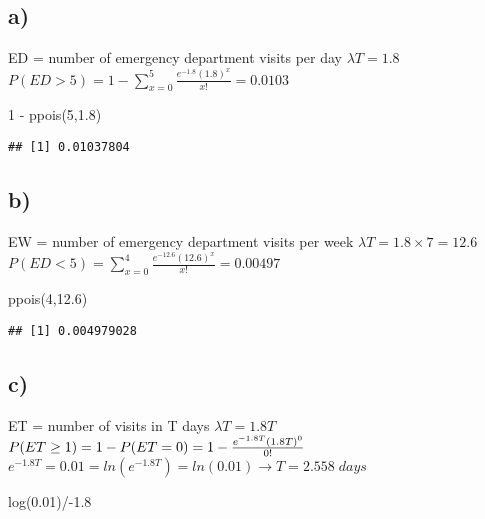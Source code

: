 \documentclass[
]{article}
\newenvironment{Shaded}{\begin{snugshade}}{\end{snugshade}}
\newcommand{\DecValTok}[1]{\textcolor[rgb]{0.00,0.00,0.81}{#1}}
\newcommand{\FloatTok}[1]{\textcolor[rgb]{0.00,0.00,0.81}{#1}}
\newcommand{\FunctionTok}[1]{\textcolor[rgb]{0.00,0.00,0.00}{#1}}
\newcommand{\NormalTok}[1]{#1}
\newcommand{\SpecialCharTok}[1]{\textcolor[rgb]{0.00,0.00,0.00}{#1}}
\begin{document}
\hypertarget{a-1}{%
\subsection{a)}\label{a-1}}

ED = number of emergency department visits per day \(\lambda T = 1.8\)
\(P(ED>5) = 1 - \sum\limits_{x=0}^{5}\frac{e^{-1.8}(1.8)^x}{x!} = 0.0103\)

\begin{Shaded}
\begin{Highlighting}[]
\DecValTok{1} \SpecialCharTok{{-}} \FunctionTok{ppois}\NormalTok{(}\DecValTok{5}\NormalTok{,}\FloatTok{1.8}\NormalTok{)}
\end{Highlighting}
\end{Shaded}

\begin{verbatim}
## [1] 0.01037804
\end{verbatim}

\hypertarget{b-1}{%
\subsection{b)}\label{b-1}}

EW = number of emergency department visits per week
\(\lambda T = 1.8 \times 7 = 12.6\)
\(P(ED<5) = \sum\limits_{x=0}^{4}\frac{e^{-12.6}(12.6)^x}{x!} = 0.00497\)

\begin{Shaded}
\begin{Highlighting}[]
\FunctionTok{ppois}\NormalTok{(}\DecValTok{4}\NormalTok{,}\FloatTok{12.6}\NormalTok{)}
\end{Highlighting}
\end{Shaded}

\begin{verbatim}
## [1] 0.004979028
\end{verbatim}

\hypertarget{c}{%
\subsection{c)}\label{c}}

ET = number of visits in T days \(\lambda T=1.8T\)
\(P(ET\ge1) = 1 -P(ET=0) = 1 - \frac{e^{-1.8T}(1.8T)^0}{0!}\\\)
\(e^{-1.8T} = 0.01 = ln(e^{-1.8T}) = ln(0.01) \rightarrow T = 2.558\;days\)

\begin{Shaded}
\begin{Highlighting}[]
\FunctionTok{log}\NormalTok{(}\FloatTok{0.01}\NormalTok{)}\SpecialCharTok{/{-}}\FloatTok{1.8}
\end{Highlighting}
\end{Shaded}
\end{document}
